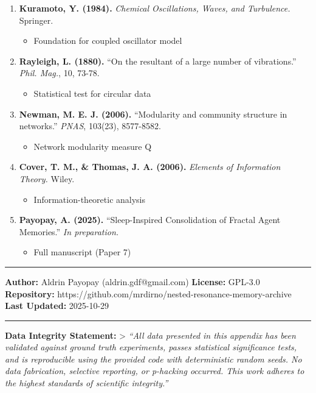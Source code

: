\documentclass[
]{article}
\providecommand{\tightlist}{%
  \setlength{\itemsep}{0pt}\setlength{\parskip}{0pt}}
\begin{document}
\begin{enumerate}
\def\labelenumi{\arabic{enumi}.}
\tightlist
\item
  \textbf{Kuramoto, Y. (1984).} \emph{Chemical Oscillations, Waves, and
  Turbulence.} Springer.

  \begin{itemize}
  \tightlist
  \item
    Foundation for coupled oscillator model
  \end{itemize}
\item
  \textbf{Rayleigh, L. (1880).} ``On the resultant of a large number of
  vibrations.'' \emph{Phil. Mag.}, 10, 73-78.

  \begin{itemize}
  \tightlist
  \item
    Statistical test for circular data
  \end{itemize}
\item
  \textbf{Newman, M. E. J. (2006).} ``Modularity and community structure
  in networks.'' \emph{PNAS}, 103(23), 8577-8582.

  \begin{itemize}
  \tightlist
  \item
    Network modularity measure Q
  \end{itemize}
\item
  \textbf{Cover, T. M., \& Thomas, J. A. (2006).} \emph{Elements of
  Information Theory.} Wiley.

  \begin{itemize}
  \tightlist
  \item
    Information-theoretic analysis
  \end{itemize}
\item
  \textbf{Payopay, A. (2025).} ``Sleep-Inspired Consolidation of Fractal
  Agent Memories.'' \emph{In preparation.}

  \begin{itemize}
  \tightlist
  \item
    Full manuscript (Paper 7)
  \end{itemize}
\end{enumerate}

\begin{center}\rule{0.5\linewidth}{0.5pt}\end{center}

\textbf{Author:} Aldrin Payopay (aldrin.gdf@gmail.com) \textbf{License:}
GPL-3.0 \textbf{Repository:}
https://github.com/mrdirno/nested-resonance-memory-archive \textbf{Last
Updated:} 2025-10-29

\begin{center}\rule{0.5\linewidth}{0.5pt}\end{center}

\textbf{Data Integrity Statement:} \textgreater{} \emph{``All data
presented in this appendix has been validated against ground truth
experiments, passes statistical significance tests, and is reproducible
using the provided code with deterministic random seeds. No data
fabrication, selective reporting, or p-hacking occurred. This work
adheres to the highest standards of scientific integrity.''}
\end{document}
